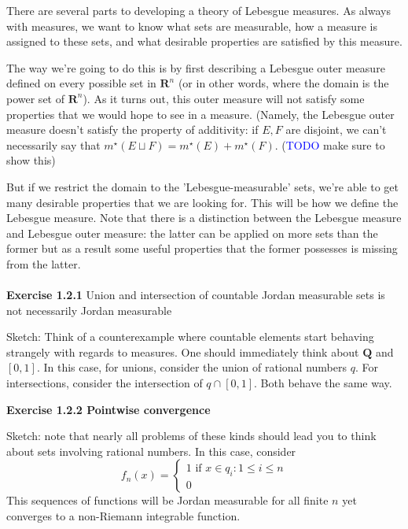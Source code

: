 \documentclass[answers,12pt]{exam}
\begin{document}
There are several parts to developing a theory of Lebesgue measures.
As always with measures, we want to know what sets are measurable, how a measure is assigned to these sets, and what desirable properties are satisfied by this measure.

The way we're going to do this is by first describing a Lebesgue outer measure defined on every possible set in $\mathbf{R}^n$ (or in other words, where the domain is the power set of $\mathbf{R}^n$).
As it turns out, this outer measure will not satisfy some properties that we would hope to see in a measure.
(Namely, the Lebesgue outer measure doesn't satisfy the property of additivity: if $E,F$ are disjoint, we can't necessarily say that $m^{\star}(E \sqcup F) = m^{\star}(E) + m^{\star}(F)$. (\textcolor{blue}{TODO} make sure to show this)

But if we restrict the domain to the 'Lebesgue-measurable' sets, we're able to get many desirable properties that we are looking for.
This will be how we define the Lebesgue measure.
Note that there is a distinction between the Lebesgue measure and Lebesgue outer measure: the latter can be applied on more sets than the former but as a result some useful properties that the former possesses is missing from the latter.
\\ \\
\textbf{Exercise 1.2.1} Union and intersection of countable Jordan measurable sets is not necessarily Jordan measurable
\begin{solution}
    Sketch: Think of a counterexample where countable elements start behaving strangely with regards to measures.
    One should immediately think about $\mathbf{Q}$ and $[0,1]$.
    In this case, for unions, consider the union of rational numbers $q$.
    For intersections, consider the intersection of $q \cap [0,1]$.
    Both behave the same way.
\end{solution}

\textbf{Exercise 1.2.2 Pointwise convergence}
\begin{solution}
    Sketch: note that nearly all problems of these kinds should lead you to think about sets involving rational numbers.
    In this case, consider 
    \[
    f_n(x)=
        \begin{cases}
        1 \text{ if } x \in {q_i: 1 \leq i \leq n} \\
        0
        \end{cases}
    \]
    This sequences of functions will be Jordan measurable for all finite $n$ yet converges to a non-Riemann integrable function.
\end{solution}
\end{document}
